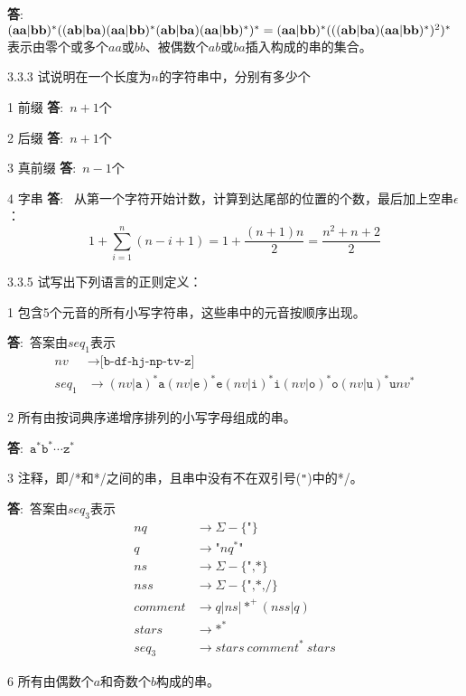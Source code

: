 \documentclass[12pt,a4paper]{article}
\newenvironment{problems}{\begin{list}{}{\renewcommand{\makelabel}[1]{\textbf{##1}\hfil}}}{\end{list}}
\newenvironment{steps}{\begin{list}{}{\renewcommand{\makelabel}[1]{##1)\hfil}}}{\end{list}}
\providecommand{\ans}{\textbf{答}:~}
\begin{document}
\begin{problems}
\begin{steps}
        \ans $\mathbf{(aa|bb)^*((ab|ba)(aa|bb)^*(ab|ba)(aa|bb)^*)^*}=\mathbf{(aa|bb)^*(((ab|ba)(aa|bb)^*)^{\rm 2})^*}$ 表示由零个或多个$aa$或$bb$、被偶数个$ab$或$ba$插入构成的串的集合。
    \end{steps} 
    \item[3.3.3] 试说明在一个长度为$n$的字符串中，分别有多少个
    \begin{steps}
        \item[1] 前缀 \ans $n+1$个 
        \item[2] 后缀 \ans $n+1$个
        \item[3] 真前缀 \ans $n-1$个
        \item[4] 字串 \ans 
        从第一个字符开始计数，计算到达尾部的位置的个数，最后加上空串$\epsilon$：
        \begin{equation*}
            1+\sum_{i=1}^n (n-i+1) =1+\frac{(n+1)n}{2}=\frac{n^2+n+2}{2}
        \end{equation*} 
    \end{steps}
    \item[3.3.5] 试写出下列语言的正则定义：
    \begin{steps}
        \item[1] 包含5个元音的所有小写字符串，这些串中的元音按顺序出现。
        
        \ans 答案由$seq_1$表示
        \begin{align*}
            nv&\rightarrow \texttt{[b-df-hj-np-tv-z]}\\
            seq_1&\rightarrow (nv|\texttt{a})^*\texttt{a}(nv|\texttt{e})^*\texttt{e}(nv|\texttt{i})^*\texttt{i}(nv|\texttt{o})^*\texttt{o}(nv|\texttt{u})^*\texttt{u}nv^*
        \end{align*}
        \item[2] 所有由按词典序递增序排列的小写字母组成的串。
        
        \ans $\texttt{a}^*\texttt{b}^*\cdots\texttt{z}^*$
        \item[3] 注释，即/*和*/之间的串，且串中没有不在双引号(\texttt{"})中的*/。
        
        \ans 答案由$seq_3$表示
        \begin{align*}
            nq&\rightarrow \Sigma-\{\texttt{"}\}\\
            q&\rightarrow \texttt{"}nq^*\texttt{"}\\
            ns&\rightarrow \Sigma-\{\texttt{",*}\}\\
            nss&\rightarrow \Sigma-\{\texttt{",*,/}\}\\
            comment&\rightarrow q|ns|*^+(nss|q)\\
            stars&\rightarrow \texttt{*}^*\\
            seq_3&\rightarrow stars~comment^*~stars
        \end{align*}
        \item[6] 所有由偶数个$a$和奇数个$b$构成的串。 
        

\end{steps}
\end{problems}
\end{document}
